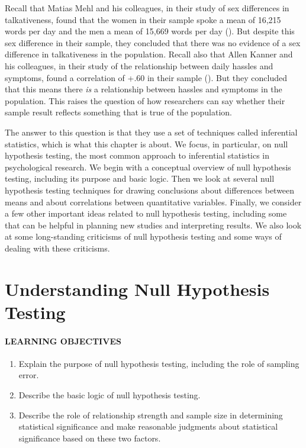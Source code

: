 \documentclass[
]{krantz}
\providecommand{\tightlist}{%
  \setlength{\itemsep}{0pt}\setlength{\parskip}{0pt}}
\begin{document}
Recall that Matias Mehl and his colleagues, in their study of sex differences in talkativeness, found that the women in their sample spoke a mean of 16,215 words per day and the men a mean of 15,669 words per day (). But despite this sex difference in their sample, they concluded that there was no evidence of a sex difference in talkativeness in the population. Recall also that Allen Kanner and his colleagues, in their study of the relationship between daily hassles and symptoms, found a correlation of +.60 in their sample (). But they concluded that this means there \emph{is} a relationship between hassles and symptoms in the population. This raises the question of how researchers can say whether their sample result reflects something that is true of the population.

The answer to this question is that they use a set of techniques called inferential statistics, which is what this chapter is about. We focus, in particular, on null hypothesis testing, the most common approach to inferential statistics in psychological research. We begin with a conceptual overview of null hypothesis testing, including its purpose and basic logic. Then we look at several null hypothesis testing techniques for drawing conclusions about differences between means and about correlations between quantitative variables. Finally, we consider a few other important ideas related to null hypothesis testing, including some that can be helpful in planning new studies and interpreting results. We also look at some long-standing criticisms of null hypothesis testing and some ways of dealing with these criticisms.

\section{Understanding Null Hypothesis Testing}\label{understanding-null-hypothesis-testing}

\paragraph*{LEARNING OBJECTIVES}\label{learning-objectives-36}

\begin{enumerate}
\def\labelenumi{\arabic{enumi}.}
\tightlist
\item
  Explain the purpose of null hypothesis testing, including the role of sampling error.
\item
  Describe the basic logic of null hypothesis testing.
\item
  Describe the role of relationship strength and sample size in determining statistical significance and make reasonable judgments about statistical significance based on these two factors.
\end{enumerate}
\end{document}
